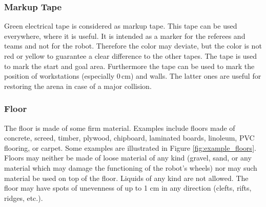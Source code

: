 \subsubsection{Markup Tape}
\label{subsubsec: Markup Tape}

Green electrical tape is considered as markup tape. This tape can be used everywhere, where it is useful. It is intended as a marker for the referees and teams and not for the robot. Therefore the color may deviate, but the color is not red or yellow to guarantee a clear difference to the other tapes. The tape is used to mark the start and goal area. Furthermore the tape can be used to mark the position of workstations (especially $0\,\text{cm}$) and walls. The latter ones are useful for restoring the arena in case of a major collision.

\subsubsection{Floor}
The floor is made of some firm material. Examples include floors made of concrete, screed, timber, plywood, chipboard, laminated boards, linoleum, PVC flooring, or carpet. Some examples are illustrated in Figure \ref{fig:example_floors}. Floors may neither be made of loose material of any kind (gravel, sand, or any material which may damage the functioning of the robot's wheels) nor may such material be used on top of the floor. Liquids of any kind are not allowed. The floor may have spots of unevenness of up to 1 cm in any direction (clefts, rifts, ridges, etc.).

